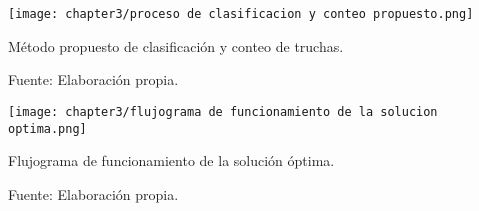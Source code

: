 \begin{landscape}
	\begin{myfigure}[H]
		\footnotesize\centering
		\texttt{[image: chapter3/proceso de clasificacion y conteo propuesto.png]}
		\caption{Método propuesto de clasificación y conteo de truchas.}%
		\begin{myflushcenter}
			Fuente: Elaboración propia.
		\end{myflushcenter}
		\label{fig:proceso de clasificacion y conteo propuesto}
	\end{myfigure}
\end{landscape}

\begin{landscape}
	\begin{myfigure}[H]
		\footnotesize\centering
		\texttt{[image: chapter3/flujograma de funcionamiento de la solucion optima.png]}
		\caption{Flujograma de funcionamiento de la solución óptima.}
		\begin{myflushcenter}
			Fuente: Elaboración propia.
		\end{myflushcenter}
		\label{fig:flujograma de funcionamiento de la solucion optima}
	\end{myfigure}
\end{landscape}
